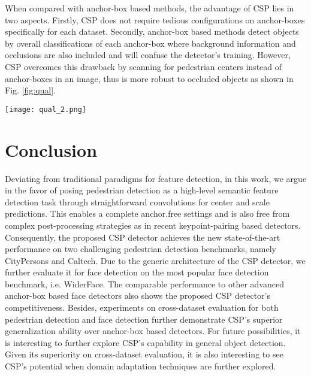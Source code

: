 \documentclass[review]{elsarticle}
\begin{document}
When compared with anchor-box based methods, the advantage of CSP lies in two aspects. Firstly, CSP does not require tedious configurations on anchor-boxes specifically for each dataset. Secondly, anchor-box based methods detect objects by overall classifications of each anchor-box where background information and occlusions are also included and will confuse the detector's training. However, CSP overcomes this drawback by scanning for pedestrian centers instead of anchor-boxes in an image, thus is more robust to occluded objects as shown in Fig. \ref{fig:qual}.



\begin{figure*}[t]
\begin{center}
\texttt{[image: qual\_2.png]}
\end{center}
   \caption{Different type of challenges present in pedestrian detection such as person-over-person occlusion (left), occlusion due to cars and objects (middle) and low illumination (right). CSP is robust enough to handle such challenging scenarios}
\label{fig:qual}
\end{figure*}


\section{Conclusion}

Deviating from traditional paradigms for feature detection, in this work, we argue in the favor of posing pedestrian detection as a high-level semantic feature detection task through straightforward convolutions for center and scale predictions. This enables a complete anchor.free settings and is also free from complex post-processing strategies as in recent keypoint-pairing based detectors. Consequently, the proposed CSP detector achieves the new state-of-the-art performance on two challenging pedestrian detection benchmarks, namely CityPersons and Caltech. Due to the generic architecture of the CSP detector, we further evaluate it for face detection on the most popular face detection benchmark, i.e. WiderFace. The comparable performance to other advanced anchor-box based face detectors also shows the proposed CSP detector's competitiveness. Besides, experiments on cross-dataset evaluation for both pedestrian detection and face detection further demonstrate CSP's superior generalization ability over anchor-box based detectors. For future possibilities, it is interesting to further explore CSP's capability in general object detection. Given its superiority on cross-dataset evaluation, it is also interesting to see CSP's potential when domain adaptation techniques are further explored.
  










\end{document}
